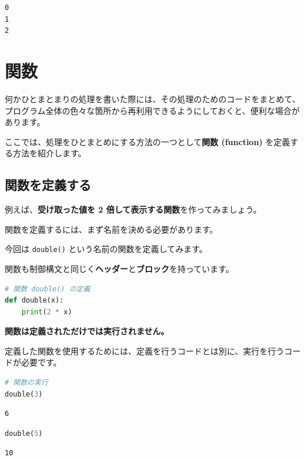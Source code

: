 \begin{lstlisting}[style=outputcell]
0
1
2
\end{lstlisting}

\section{関数}


何かひとまとまりの処理を書いた際には、その処理のためのコードをまとめて、プログラム全体の色々な箇所から再利用できるようにしておくと、便利な場合があります。

ここでは、処理をひとまとめにする方法の一つとして\textbf{関数 (function)} を定義する方法を紹介します。


\subsection{関数を定義する}




例えば、\textbf{受け取った値を 2 倍して表示する関数}を作ってみましょう。


関数を定義するには、まず名前を決める必要があります。

今回は \texttt{double()} という名前の関数を定義してみます。


関数も制御構文と同じく\textbf{ヘッダー}と\textbf{ブロック}を持っています。


\begin{lstlisting}[style=codecell,language=Python]
# 関数 double() の定義
def double(x):
    print(2 * x)
\end{lstlisting}

\textbf{関数は定義されただけでは実行されません。}

定義した関数を使用するためには、定義を行うコードとは別に、実行を行うコードが必要です。


\begin{lstlisting}[style=codecell,language=Python]
# 関数の実行
double(3)
\end{lstlisting}

\begin{lstlisting}[style=outputcell]
6
\end{lstlisting}

\begin{lstlisting}[style=codecell,language=Python]
double(5)
\end{lstlisting}

\begin{lstlisting}[style=outputcell]
10
\end{lstlisting}

